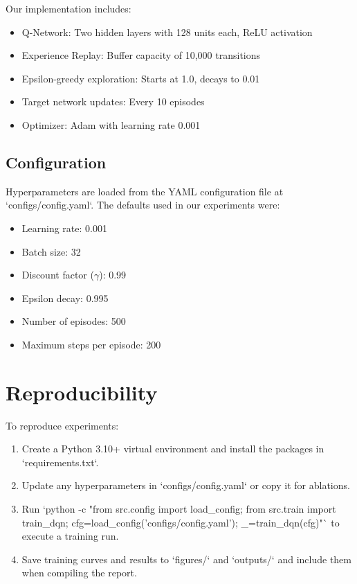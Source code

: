 \documentclass{article}
\begin{document}
Our implementation includes:
\begin{itemize}
\item Q-Network: Two hidden layers with 128 units each, ReLU activation
\item Experience Replay: Buffer capacity of 10,000 transitions
\item Epsilon-greedy exploration: Starts at 1.0, decays to 0.01
\item Target network updates: Every 10 episodes
\item Optimizer: Adam with learning rate 0.001
\end{itemize}

\subsection{Configuration}

Hyperparameters are loaded from the YAML configuration file at `configs/config.yaml`. The defaults used in our experiments were:
\begin{itemize}
\item Learning rate: 0.001
\item Batch size: 32
\item Discount factor ($\gamma$): 0.99
\item Epsilon decay: 0.995
\item Number of episodes: 500
\item Maximum steps per episode: 200
\end{itemize}

\section{Reproducibility}

To reproduce experiments:
\begin{enumerate}
\item Create a Python 3.10+ virtual environment and install the packages in `requirements.txt`.
\item Update any hyperparameters in `configs/config.yaml` or copy it for ablations.
\item Run `python -c "from src.config import load_config; from src.train import train_dqn; cfg=load_config('configs/config.yaml'); _=train_dqn(cfg)"` to execute a training run.
\item Save training curves and results to `figures/` and `outputs/` and include them when compiling the report.
\end{enumerate}
\end{document}
